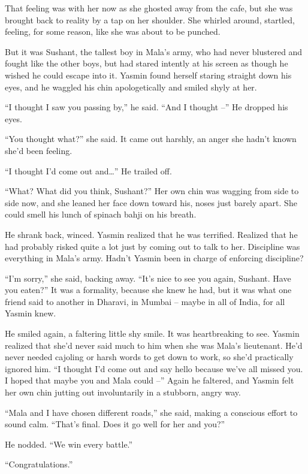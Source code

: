 That feeling was with her now as she ghosted away from the cafe,
but she was brought back to reality by a tap on her shoulder. She
whirled around, startled, feeling, for some reason, like she was
about to be punched.

But it was Sushant, the tallest boy in Mala's army, who had never
blustered and fought like the other boys, but had stared intently
at his screen as though he wished he could escape into it. Yasmin
found herself staring straight down his eyes, and he waggled his
chin apologetically and smiled shyly at her.

``I thought I saw you passing by,'' he said. ``And I thought --'' He
dropped his eyes.

``You thought what?'' she said. It came out harshly, an anger she
hadn't known she'd been feeling.

``I thought I'd come out and\ldots{}'' He trailed off.

``What? What did you think, Sushant?'' Her own chin was wagging from
side to side now, and she leaned her face down toward his, noses
just barely apart. She could smell his lunch of spinach bahji on
his breath.

He shrank back, winced. Yasmin realized that he was terrified.
Realized that he had probably risked quite a lot just by coming out
to talk to her. Discipline was everything in Mala's army. Hadn't
Yasmin been in charge of enforcing discipline?

``I'm sorry,'' she said, backing away. ``It's nice to see you again,
Sushant. Have you eaten?'' It was a formality, because she knew he
had, but it was what one friend said to another in Dharavi, in
Mumbai -- maybe in all of India, for all Yasmin knew.

He smiled again, a faltering little shy smile. It was heartbreaking
to see. Yasmin realized that she'd never said much to him when she
was Mala's lieutenant. He'd never needed cajoling or harsh words to
get down to work, so she'd practically ignored him. ``I thought I'd
come out and say hello because we've all missed you. I hoped that
maybe you and Mala could --'' Again he faltered, and Yasmin felt her
own chin jutting out involuntarily in a stubborn, angry way.

``Mala and I have chosen different roads,'' she said, making a
conscious effort to sound calm. ``That's final. Does it go well for
her and you?''

He nodded. ``We win every battle.''

``Congratulations.''

